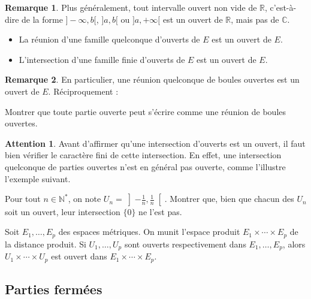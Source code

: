\documentclass[french]{article}
\newcommand{\N}{\mathbb{N}}
\newcommand{\R}{\mathbb{R}}
\newcommand{\C}{\mathbb{C}}
\newcommand{\st}{^*}
\theoremstyle{plain}
\theoremstyle{definition}
\newtheorem*{rmq}{Remarque}
\newtheorem*{attention}{Attention}
\theoremstyle{remark}
\begin{document}
\begin{rmq}
	Plus généralement, tout intervalle ouvert non vide de $\R$, c'est-à-dire de la forme $]-\infty,b[$, $]a,b[$ ou $]a,+\infty[$ est un ouvert de $\R$, mais pas de $\C$.
\end{rmq}

\begin{prop}%
	\begin{itemize}
		\item La réunion d'une famille quelconque d'ouverts de $E$ est un ouvert de $E$.
		\item L'intersection d'une famille finie d'ouverts de $E$ est un ouvert de $E$.
	\end{itemize}
\end{prop}

\begin{rmq}
	En particulier, une réunion quelconque de boules ouvertes est un ouvert de $E$. Réciproquement :
\end{rmq}

\begin{exo}
	Montrer que toute partie ouverte peut s'écrire comme une réunion de boules ouvertes.
\end{exo}

\begin{attention}
	Avant d'affirmer qu'une intersection d'ouverts est un ouvert, il faut bien vérifier le caractère fini de cette intersection. En effet, une intersection quelconque de parties ouvertes n'est en général pas ouverte, comme l'illustre l'exemple suivant.
\end{attention}

\begin{exo}
	Pour tout $n\in\N\st$, on note $U_n=\displaystyle\left]-\frac{1}{n},\frac{1}{n}\right[$. Montrer que, bien que chacun des $U_n$ soit un ouvert, leur intersection $\{0\}$ ne l'est pas.
\end{exo}

\begin{prop}%
	Soit $E_1,\ldots,E_p$ des espaces métriques. On munit l'espace produit $E_1\times\cdots\times E_p$ de la distance produit. Si $U_1,\ldots,U_p$ sont ouverts respectivement dans $E_1,\ldots,E_p$, alors $U_1\times\cdots\times U_p$ est ouvert dans $E_1\times\cdots\times E_p$.
\end{prop}

\subsection{Parties fermées}
\end{document}
